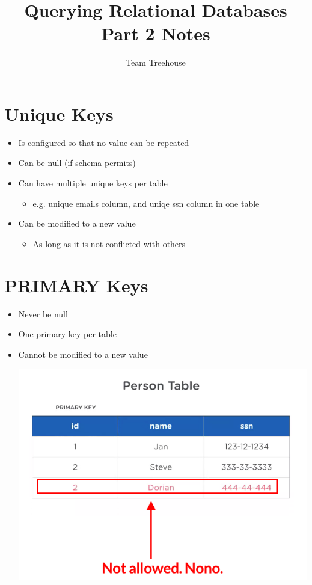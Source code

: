 \documentclass[12pt]{article}
\begin{document}
\title{Querying Relational Databases Part 2 Notes}
\author{Team Treehouse}
\maketitle

\bigskip

\section{Unique Keys}

\bigskip

\begin{itemize}
    \item Is configured so that no value can be repeated
    \item Can be null (if schema permits)
    \item Can have multiple unique keys per table
    \begin{itemize}
        \item e.g. unique emails column, and uniqe ssn column in one table
    \end{itemize}
    \item Can be modified to a new value
    \begin{itemize}
        \item As long as it is not conflicted with others
    \end{itemize}
\end{itemize}

\bigskip

\section{PRIMARY Keys}

\bigskip

\begin{itemize}
    \item Never be null
    \item One primary key per table
    \item Cannot be modified to a new value

    \begin{center}
    \includegraphics[width=0.8\linewidth]{images/part_2_notes_1.png}
    \end{center}
\end{itemize}
\end{document}
